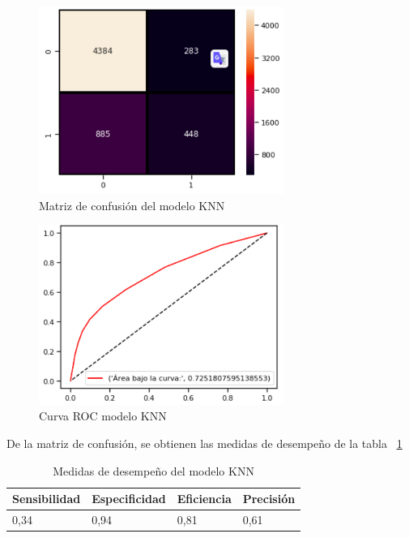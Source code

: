 \documentclass[conference]{IEEEtran}
\begin{document}
\begin{center}
    \begin{figure}[H]
        \hfill
     \centerline{\includegraphics[width=8cm]{MatrixKNN.png}}
    \caption{Matriz de confusión del modelo KNN }
    \label{fig:matrixKNN}
    \end{figure}  
\end{center}

\begin{center}
    \begin{figure}[H]
        \hfill
     \centerline{\includegraphics[width=8cm]{ROCKNN.png}}
    \caption{Curva ROC modelo KNN }
    \label{fig:rocKNN}
    \end{figure}  
\end{center}
De la matriz de confusión, se obtienen las medidas de desempeño de la tabla  ~\ref{tab:medidasGknn}  
\newline
\begin{table}[H]
\centering
\begin{tabular}{|l|l|l|l|}
\hline
Sensibilidad & Especificidad & \multicolumn{1}{r|}{Eficiencia} & Precisión \\ \hline
0,34         & 0,94          & 0,81                            & 0,61      \\ \hline
\end{tabular}
\caption{Medidas de desempeño del modelo KNN}
\label{tab:medidasGknn}
\end{table}
\end{document}
